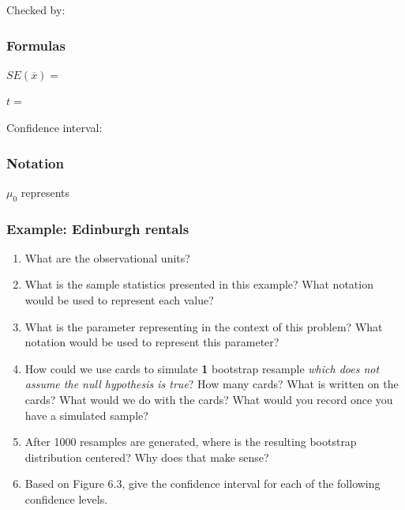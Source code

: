 \documentclass[
]{report}
\newcommand{\rgs}{\vspace{12pt}} %
\newcommand{\rgi}{\hspace{24pt}}  %
\begin{document}
\rgi Checked by:
\rgs 

\hypertarget{formulas-8}{%
\subsubsection*{Formulas}\label{formulas-8}}

\(SE(\overline{x})=\)
\rgs 

\(t=\)
\rgs 

Confidence interval:
\rgs 

\hypertarget{notation-1}{%
\subsubsection*{Notation}\label{notation-1}}

\(\mu_0\) represents
\rgs 

\hypertarget{example-edinburgh-rentals}{%
\subsubsection*{Example: Edinburgh rentals}\label{example-edinburgh-rentals}}

\begin{enumerate}
\def\labelenumi{\arabic{enumi}.}
\item
  What are the observational units?
  \rgs 
\item
  What is the sample statistics presented in this example? What notation would be used to represent each value?
  \rgs 
\item
  What is the parameter representing in the context of this problem? What notation would be used to represent this parameter?
  \rgs 
  \rgs 
\item
  How could we use cards to simulate \textbf{1} bootstrap resample \emph{which does not assume the null hypothesis is true}? How many cards? What is written on the cards? What would we do with the cards? What would you record once you have a simulated sample?
  \rgs 
  \rgs 
\item
  After 1000 resamples are generated, where is the resulting bootstrap distribution centered? Why does that make sense?
  \rgs 
  \rgs 
\item
  Based on Figure 6.3, give the confidence interval for each of the following confidence levels.
\end{enumerate}
\end{document}
